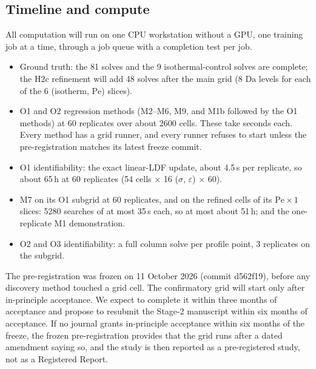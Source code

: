 \documentclass[11pt]{article}
\newcommand{\Da}{\mathrm{Da}}
\newcommand{\Pe}{\mathrm{Pe}}
\begin{document}
\subsection{Timeline and compute}
\label{sec:compute}
All computation will run on one CPU workstation without a GPU, one training job at a time,
through a job queue with a completion test per job.
\begin{itemize}
\item Ground truth: the 81 solves and the 9 isothermal-control solves are complete; the
H2c refinement will add 48 solves after the main grid (8 $\Da$ levels for each of the 6
(isotherm, $\Pe$) slices).
\item O1 and O2 regression methods (M2--M6, M9, and M1b followed by the O1 methods) at 60
replicates over about 2600 cells. These take seconds each. Every method has a grid runner,
and every runner refuses to start unless the pre-registration matches its latest freeze
commit.
\item O1 identifiability: the exact linear-LDF update, about 4.5\,s per replicate, so about
65\,h at 60 replicates (54 cells $\times$ 16 ($\sigma$, $\varepsilon$) $\times$ 60).
\item M7 on its O1 subgrid at 60 replicates, and on the refined cells of its $\Pe\times1$
slices: 5280 searches of at most 35\,s each, so at most about 51\,h; and the one-replicate M1
demonstration.
\item O2 and O3 identifiability: a full column solve per profile point, 3 replicates on
the subgrid.
\end{itemize}
The pre-registration was frozen on 11 October 2026 (commit d562f19), before any
discovery method touched a grid cell. The confirmatory grid will start only after
in-principle acceptance. We expect to complete it within three months of acceptance and
propose to resubmit the Stage-2 manuscript within six months of acceptance. If no journal
grants in-principle acceptance within six months of the freeze, the frozen
pre-registration provides that the grid runs after a dated amendment saying so, and the
study is then reported as a pre-registered study, not as a Registered Report.
\end{document}
